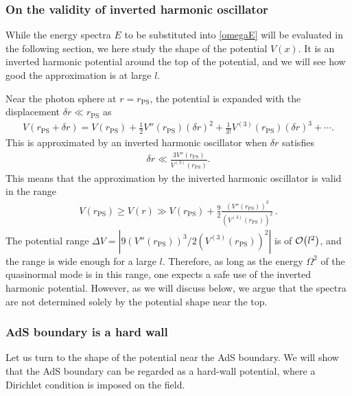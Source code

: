 \documentclass[a4paper,11pt]{article}
\begin{document}
\subsubsection{On the validity of inverted harmonic oscillator}

While the energy spectra $E$ to be substituted into \eqref{omegaE} will be evaluated in the following section, 
we here study the shape of the potential $V(x)$. It is an inverted harmonic potential around the top of the potential, and we will see how good the approximation is at large $l$.

Near the photon sphere at $r=r_\mathrm{PS}$, the potential is expanded with the displacement $\delta r\ll r_\mathrm{PS}$ as
\begin{align}
    V(r_\mathrm{PS}+\delta r)=V(r_\mathrm{PS})+\frac{1}{2}V''(r_\mathrm{PS})(\delta r)^2+\frac{1}{3!}V^{(3)}(r_\mathrm{PS})(\delta r)^3+\cdots.
\end{align}
This is approximated by an inverted harmonic oscillator when $\delta r$ satisfies
\begin{align}
    \delta r\ll\frac{3V''(r_\mathrm{PS})}{V^{(3)}(r_\mathrm{PS})}.
\end{align}
This means that the approximation by the iniverted harmonic oscillator is valid in the range
\begin{align}
    V(r_\mathrm{PS})\geq V(r)\gg V(r_\mathrm{PS})+\frac{9}{2}\frac{(V''(r_\mathrm{PS}))^3}{(V^{(3)}(r_\mathrm{PS}))^2} \, .
\end{align}
The potential range $\Delta V=|9(V''(r_\mathrm{PS}))^3/2(V^{(3)}(r_\mathrm{PS}))^2|$ is of $\order{l^2}$, and the range is wide enough for a large $l$. Therefore, as long as the energy $\Omega^2$ of the quasinormal mode is in this range, one expects a safe use of the inverted harmonic potential. 
However, as we will discuss below, we argue that the spectra are not determined solely by the potential shape near the top.




\subsubsection{AdS boundary is a hard wall}

Let us turn to the shape of the potential near the AdS boundary.
We will show that the AdS boundary can be regarded as a hard-wall potential, where a Dirichlet condition is imposed on the field.
\end{document}
